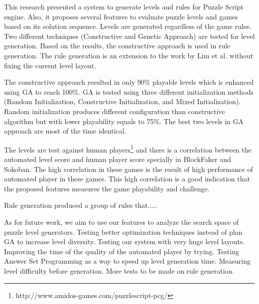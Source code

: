 This research presented a system to generate levels and rules for Puzzle Script engine. Also, it proposes several features to evaluate puzzle levels and games based on its solution sequence. Levels are generated regardless of the game rules. Two different techniques (Constructive and Genetic Approach) are tested for level generation. Based on the results, the constructive approach is used in rule generation. The rule generation is an extension to the work by Lim et al.\cite{puzzleScriptGeneration} without fixing the current level layout.\\\par

The constructive approach resulted in only 90\% playable levels which is enhanced using GA to reach 100\%. GA is tested using three different initialization methods (Random Initialization, Constructive Initialization, and Mixed Initialization). Random initialization produces different configuration than constructive algorithm but with lower playability equals to 75\%. The best two levels in GA approach are most of the time identical.\\\par

The levels are test against human players\footnote{http://www.amidos-games.com/puzzlescript-pcg/} and there is a correlation between the automated level score and human player score specially in BlockFaker and Sokoban. The high correlation in these games is the result of high performance of automated player in these games. This high correlation is a good indication that the proposed features measures the game playability and challenge.\\\par

Rule generation produced a group of rules that.....\\\par

As for future work, we aim to use our features to analyze the search space of puzzle level generators. Testing better optimization techniques instead of plan GA to increase level diversity. Testing our system with very huge level layouts. Improving the time of the quality of the automated player by trying. Testing Answer Set Programming as a way to speed up level generation time. Measuring level difficulty before generation. More tests to be made on rule generation.